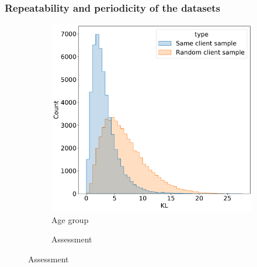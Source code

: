 \documentclass[sigconf, anonymous]{acmart}
\begin{document}

\subsubsection{Repeatability and periodicity of the datasets} \label{sec-period}

\begin{figure}
  \centering
  \begin{subfigure}{0.25\linewidth}
    \caption{Age group}
    \includegraphics[width=\linewidth]{figures/kl_dis_age_group.pdf}
  \end{subfigure}%
  \begin{subfigure}{0.25\linewidth}
    \caption{Assessment}

\end{subfigure}
\end{figure}
\end{document}
